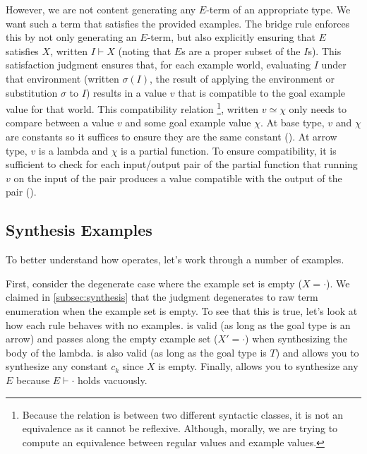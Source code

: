 However, we are not content generating any $E$-term of an appropriate type.
We want such a term that satisfies the provided examples.
The bridge rule  enforces this by not only generating an $E$-term, but also explicitly ensuring that $E$ satisfies $Χ$, written $I ⊢ Χ$ (noting that $E$s are a proper subset of the $I$s).
This satisfaction judgment ensures that, for each example world, evaluating $I$ under that environment (written $σ(I)$, the result of applying the environment or substitution $σ$ to $I$) results in a value $v$ that is compatible to the goal example value for that world.
This compatibility relation%
\footnote{%
  Because the relation is between two different syntactic classes, it is not an equivalence as it cannot be reflexive.
  Although, morally, we are trying to compute an equivalence between regular values and example values.
},
written $v ≃ χ$ only needs to compare between a value $v$ and some goal example value $χ$.
At base type, $v$ and $χ$ are constants so it suffices to ensure they are the same constant ().
At arrow type, $v$ is a lambda and $χ$ is a partial function.
To ensure compatibility, it is sufficient to check for each input/output pair of the partial function that running $v$ on the input of the pair produces a value compatible with the output of the pair ().

\subsection{Synthesis Examples}
\label{subsec:synthesis-examples}

To better understand how \lsyn{} operates, let's work through a number of examples.

\begin{example}
  First, consider the degenerate case where the example set is empty ($Χ = ·$).
  We claimed in \autoref{subsec:synthesis} that the  judgment degenerates to raw term enumeration when the example set is empty.
  To see that this is true, let's look at how each  rule behaves with no examples.
   is valid (as long as the goal type is an arrow) and passes along the empty example set ($X' = ·$) when synthesizing the body of the lambda.
   is also valid (as long as the goal type is $T$) and allows you to synthesize any constant $c_k$ since $X$ is empty.
  Finally,  allows you to synthesize any $E$ because $E ⊢ ·$ holds vacuously.
\end{example}

